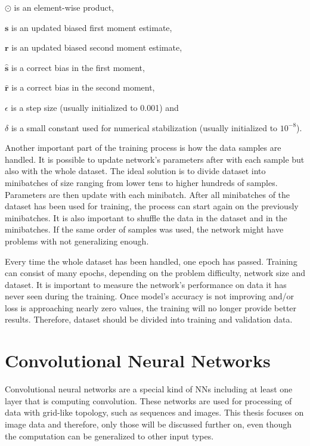 $\odot$ is an element-wise product,

$\pmb s$ is an updated biased first moment estimate,

$\pmb r$ is an updated biased second moment estimate,

$\hat{\pmb s}$ is a correct bias in the first moment,

$\hat{\pmb r}$ is a correct bias in the second moment,

$\epsilon$ is a step size (usually initialized to 0.001) and

$\delta$ is a small constant used for numerical stabilization (usually initialized to $10^{-8}$).

\vspace{0.2cm}

Another important part of the training process is how the data samples are handled. It is possible to update network's parameters after with each sample but also with the whole dataset. The ideal solution is to divide dataset into minibatches of size ranging from lower tens to higher hundreds of samples. Parameters are then update with each minibatch. After all minibatches of the dataset has been used for training, the process can start again on the previously minibatches. It is also important to shuffle the data in the dataset and in the minibatches. If the same order of samples was used, the network might have problems with not generalizing enough.

Every time the whole dataset has been handled, one epoch has passed. Training can consist of many epochs, depending on the problem difficulty, network size and dataset. It is important to measure the network's performance on data it has never seen during the training. Once model's accuracy is not improving and/or loss is approaching nearly zero values, the training will no longer provide better results. Therefore, dataset should be divided into training and validation data.

\section{\label{sec:cnn}Convolutional Neural Networks}

Convolutional neural networks are a special kind of NNs including at least one layer that is computing convolution. These networks are used for processing of data with grid-like topology, such as sequences and images. This thesis focuses on image data and therefore, only those will be discussed further on, even though the computation can be generalized to other input types.

